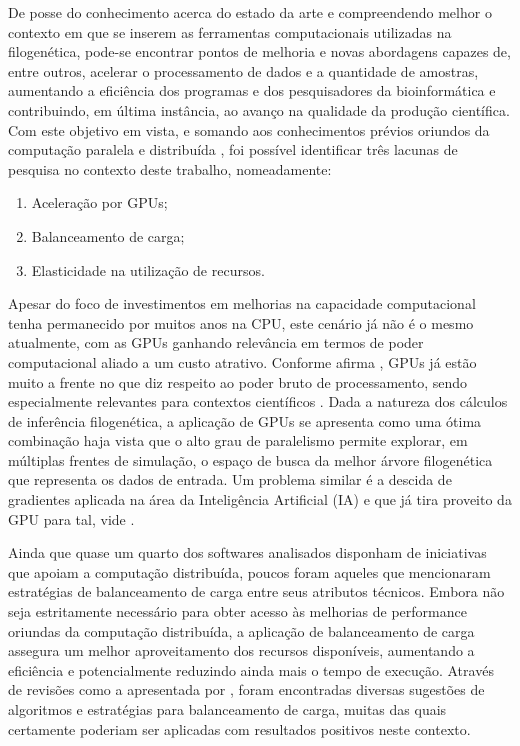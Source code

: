 \documentclass[english,brazilian]{UNISINOSmonografia} %
\begin{document}
De posse do conhecimento acerca do estado da arte e compreendendo melhor o contexto em que se inserem as ferramentas computacionais utilizadas na filogenética, pode-se encontrar pontos de melhoria e novas abordagens capazes de, entre outros, acelerar o processamento de dados e a quantidade de amostras, aumentando a eficiência dos programas e dos pesquisadores da bioinformática e contribuindo, em última instância, ao avanço na qualidade da produção científica.
Com este objetivo em vista, e somando aos conhecimentos prévios oriundos da computação paralela e distribuída \cite{Righi2013,Aubin2016,Aubin2017}, 
foi possível identificar três lacunas de pesquisa no contexto deste trabalho, nomeadamente: 
\begin{enumerate}[label=Lacuna~\arabic*:~,itemindent=*]
	\item Aceleração por GPUs;
	\item Balanceamento de carga;
	\item Elasticidade na utilização de recursos.
\end{enumerate}




Apesar do foco de investimentos em melhorias na capacidade computacional tenha permanecido por muitos anos na CPU, este cenário já não é o mesmo atualmente, com as GPUs ganhando relevância em termos de poder computacional aliado a um custo atrativo.
Conforme afirma \cite{nvidia2018}, GPUs já estão muito a frente no que diz respeito ao poder bruto de processamento, sendo especialmente relevantes para contextos científicos \cite{Aji2013}.
Dada a natureza dos cálculos de inferência filogenética, a aplicação de GPUs se apresenta como uma ótima combinação haja vista que o alto grau de paralelismo permite explorar, em múltiplas frentes de simulação, o espaço de busca da melhor árvore filogenética que representa os dados de entrada.
Um problema similar é a descida de gradientes aplicada na área da Inteligência Artificial (IA) e que já tira proveito da GPU para tal, vide .




Ainda que quase um quarto dos softwares analisados disponham de iniciativas que apoiam a computação distribuída, poucos foram aqueles que mencionaram estratégias de balanceamento de carga entre seus atributos técnicos.
Embora não seja estritamente necessário para obter acesso às melhorias de performance oriundas da computação distribuída, a aplicação de balanceamento de carga assegura um melhor aproveitamento dos recursos disponíveis, aumentando a eficiência e potencialmente reduzindo ainda mais o tempo de execução.
Através de revisões como a apresentada por , foram encontradas diversas sugestões de algoritmos e estratégias para balanceamento de carga, muitas das quais certamente poderiam ser aplicadas com resultados positivos neste contexto.
\end{document}
